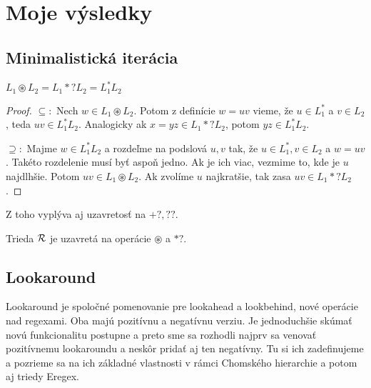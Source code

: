 \chapter{Moje výsledky}
\label{chap:vysledky}

\section{Minimalistická iterácia}
\label{iteracia}

\begin{veta}
$L_1 \circledast L_2 = L_1 *? L_2 = L_1^*L_2$
\end{veta}
\begin{proof}
$\subseteq:$
Nech $w \in L_1 \circledast L_2$. Potom z definície $w=uv$ vieme, že $u \in L_1^*$ a $v \in L_2$, teda $uv \in L_1^*L_2$. Analogicky ak $x=yz \in L_1 *? L_2$, potom $yz \in L_1^*L_2$.

$\supseteq:$
Majme $w \in L_1^*L_2$ a rozdeľme na podslová $u,v$ tak, že $u \in L_1^*, v \in L_2$ a $w=uv$. Takéto rozdelenie musí byť aspoň jedno. Ak je ich viac, vezmime to, kde je $u$ najdlhšie. Potom $uv \in L_1 \circledast L_2$. Ak zvolíme $u$ najkratšie, tak zasa $uv \in L_1 *? L_2$.
\end{proof}

Z toho vyplýva aj uzavretosť na $+?,??$.

\begin{dosledok}
Trieda ${\cal R}$ je uzavretá na operácie $\circledast$ a $*?$.
\end{dosledok}

\section{Lookaround}
\label{chap:lookahead}

Lookaround je spoločné pomenovanie pre lookahead a lookbehind, nové operácie nad regexami. Oba majú pozitívnu a negatívnu verziu. Je jednoduchšie skúmať novú fun\-kcio\-na\-li\-tu postupne a preto sme sa rozhodli najprv sa venovať pozitívnemu lookaroundu a neskôr pridať aj ten negatívny. Tu si ich zadefinujeme a pozrieme sa na ich základné vlastnosti v rámci Chomského hierarchie a potom aj triedy Eregex.

